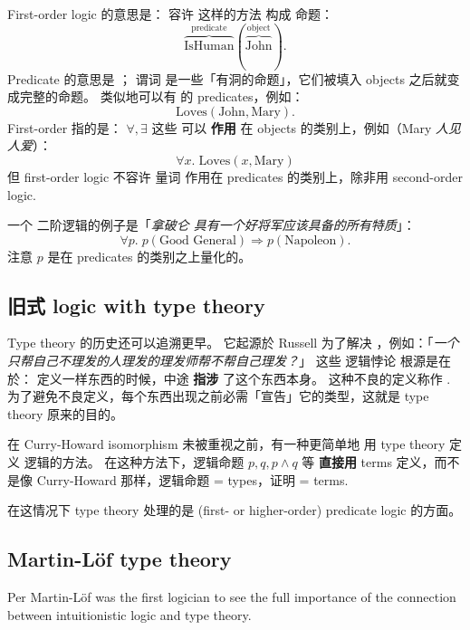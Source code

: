 First-order logic 的意思是： 容许 这样的方法 构成 命题：
\begin{equation}
\overbrace{\mbox{IsHuman}}^{\mbox{predicate}} ( \overbrace{\mbox{John}}^{\mbox{object}} ).
\end{equation}
Predicate 的意思是 ； 谓词 是一些「有洞的命题」，它们被填入 objects 之后就变成完整的命题。 类似地可以有 的 predicates，例如：
\begin{equation}
\mbox{Loves} (\mbox{John}, \mbox{Mary}).
\end{equation}
First-order 指的是： $\forall, \exists$ 这些  可以 \textbf{作用} 在 objects 的类别上，例如（Mary \textit{人见人爱}）：
\begin{equation}
\forall x. \; \mbox{Loves}(x, \mbox{Mary})
\end{equation}
但 first-order logic 不容许 量词 作用在 predicates 的类别上，除非用 second-order logic.

一个 二阶逻辑的例子是「\textit{拿破仑 具有一个好将军应该具备的所有特质}」：
\begin{equation}
\forall p. \; p(\mbox{Good General}) \Rightarrow p(\mbox{Napoleon}).
\end{equation}
注意 $p$ 是在 predicates 的类别之上量化的。

\subsection{旧式 logic with type theory}

Type theory 的历史还可以追溯更早。 它起源於 Russell 为了解决 ，例如：「\textit{一个只帮自己不理发的人理发的理发师帮不帮自己理发？}」  这些 逻辑悖论 根源是在於： 定义一样东西的时候，中途 \textbf{指涉} 了这个东西本身。 这种不良的定义称作 .  为了避免不良定义，每个东西出现之前必需「宣告」它的类型，这就是 type theory 原来的目的。 

在 Curry-Howard isomorphism 未被重视之前，有一种更简单地 用 type theory 定义 逻辑的方法。 在这种方法下，逻辑命题 $p, q, p \wedge q$ 等 \textbf{直接用} terms 定义，而不是像 Curry-Howard 那样，逻辑命题 = types，证明 = terms.

在这情况下 type theory 处理的是 (first- or higher-order) predicate logic 的方面。 

\subsection{Martin-L\"{o}f type theory}

Per Martin-L\"{o}f was the first logician to see the full importance of the connection between intuitionistic logic and type theory.

